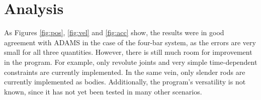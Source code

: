 \documentclass{article}
\begin{document}
	\section*{Analysis}
	As Figures \ref*{fig:pos}, \ref*{fig:vel} and \ref*{fig:acc} show, the results were in good agreement with ADAMS in the case of the four-bar system, as the errors are very small for all three quantities. However, there is still much room for improvement in the program. For example, only revolute joints and very simple time-dependent constraints are currently implemented. In the same vein, only slender rods are currently implemented as bodies. Additionally, the program's versatility is not known, since it has not yet been tested in many other scenarios.
\end{document}
